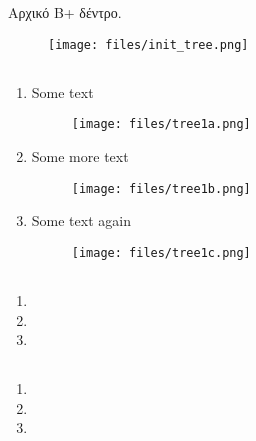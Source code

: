 \documentclass[a4paper,10pt]{article}
\begin{document}
\def\thesection {Άσκηση \arabic{section}}
\def\thesubsection {\alph{subsection}}
\renewcommand{\labelenumi}{(\arabic{enumi})}
\renewcommand{\labelenumii}{(\arabic{enumii})}



\section{}
\noindent Αρχικό B+ δέντρο.
\begin{figure}[h]
	\centering
	\texttt{[image: files/init\_tree.png]}
\end{figure}

\subsection{}
		\begin{enumerate}
			\item
				Some text

				\begin{figure}[H]
					\centering
					\texttt{[image: files/tree1a.png]}
				\end{figure}
			\item
				Some more text

				\begin{figure}[H]
					\centering
					\texttt{[image: files/tree1b.png]}
				\end{figure}
			\item
				Some text again

				\begin{figure}[H]
					\centering
					\texttt{[image: files/tree1c.png]}
				\end{figure}
		\end{enumerate}
\subsection{}
		\begin{enumerate}
			\item
			\item
			\item
		\end{enumerate}
\subsection{}
		\begin{enumerate}
			\item
			\item
			\item
		\end{enumerate}
\section{}
\section{}
\section{}
\end{document}
